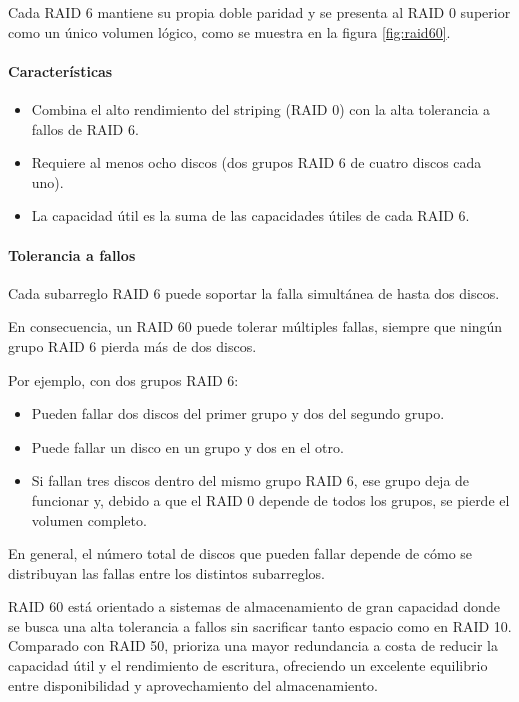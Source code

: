 Cada RAID 6 mantiene su propia doble paridad y se presenta al RAID 0 superior como un único volumen lógico, como se muestra en la figura \ref{fig:raid60}.

\paragraph{Características}
\begin{itemize}
  \item Combina el alto rendimiento del striping (RAID 0) con la alta tolerancia a fallos de RAID 6.
  \item Requiere al menos ocho discos (dos grupos RAID 6 de cuatro discos cada uno).
  \item La capacidad útil es la suma de las capacidades útiles de cada RAID 6.
\end{itemize}

\paragraph{Tolerancia a fallos}

Cada subarreglo RAID 6 puede soportar la falla simultánea de hasta dos discos.

En consecuencia, un RAID 60 puede tolerar múltiples fallas, siempre que ningún grupo RAID 6 pierda más de dos discos.

Por ejemplo, con dos grupos RAID 6:
\begin{itemize}
  \item Pueden fallar dos discos del primer grupo y dos del segundo grupo.
  \item Puede fallar un disco en un grupo y dos en el otro.
  \item Si fallan tres discos dentro del mismo grupo RAID 6, ese grupo deja de funcionar y, debido a que el RAID 0 depende de todos los grupos, se pierde el volumen completo.
\end{itemize}
En general, el número total de discos que pueden fallar depende de cómo se distribuyan las fallas entre los distintos subarreglos.

RAID 60 está orientado a sistemas de almacenamiento de gran capacidad donde se busca una alta tolerancia a fallos sin sacrificar tanto espacio como en RAID 10. Comparado con RAID 50, prioriza una mayor redundancia a costa de reducir la capacidad útil y el rendimiento de escritura, ofreciendo un excelente equilibrio entre disponibilidad y aprovechamiento del almacenamiento.

